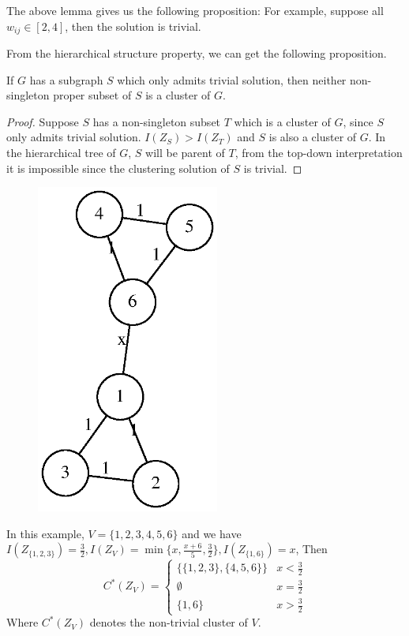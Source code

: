 \documentclass{article}
\begin{document}
The above lemma gives us the following proposition:
For example, suppose all $w_{ij} \in [2,4]$, then the solution is trivial.

From the hierarchical structure property, we can get the following proposition.

\begin{proposition}
If $G$ has a subgraph $S$ which only admits trivial solution, then neither non-singleton proper subset of $S$ is a cluster of $G$. 
\end{proposition}

\begin{proof}
Suppose  $S$ has a non-singleton subset $T$ which is a cluster of $G$, since $S$ only admits trivial solution. $I(Z_S) > I(Z_T)$ and $S$ is also a cluster of $G$. In the hierarchical tree of $G$, $S$ will be parent of $T$, from the top-down interpretation it is impossible since the clustering solution of $S$ is trivial.
\end{proof}
\begin{example}\label{ex:6point}
\begin{figure}[!ht]
\centering
\includegraphics[width=6cm]{pic/6point.eps}
\end{figure}
In this example, $V=\{1,2,3,4,5,6\}$ and we have $I(Z_{\{1,2,3\}})=\frac{3}{2}, I(Z_V) = \min\{x,\frac{x+6}{5}, \frac{3}{2}\}, I(Z_{\{1,6\}})=x$, Then
\begin{equation*}
C^*(Z_V) = 
\begin{cases}
\{\{1,2,3\},\{4,5,6\}\} & x < \frac{3}{2} \\
\emptyset & x = \frac{3}{2} \\
\{1,6\} & x>\frac{3}{2}
\end{cases}
\end{equation*}
Where $C^*(Z_V)$ denotes the non-trivial cluster of $V$.
\end{example}
\end{document}
